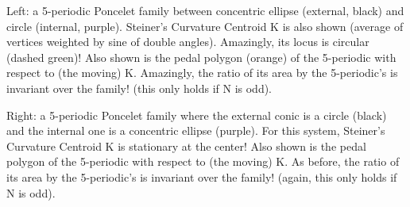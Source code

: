 Left: a 5-periodic Poncelet family between concentric ellipse (external, black) and circle (internal, purple). Steiner's Curvature Centroid K is also shown (average of vertices weighted by sine of double angles). Amazingly, its locus is circular (dashed green)! Also shown is the pedal polygon (orange) of the 5-periodic with respect to (the moving) K. Amazingly, the ratio of its area by the 5-periodic's is invariant over the family! (this only holds if N is odd).

Right: a 5-periodic Poncelet family where the external conic is a circle (black) and the internal one is a concentric ellipse (purple). For this system, Steiner's Curvature Centroid K is stationary at the center! Also shown is the pedal polygon of the 5-periodic with respect to (the moving) K. As before, the ratio of its area by the 5-periodic's is invariant over the family! (again, this only holds if N is odd).